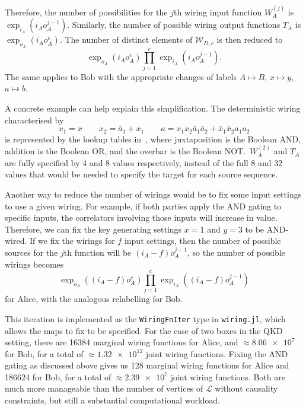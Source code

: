 \documentclass[10pt, a4paper]{article}
\numberwithin{equation}{section} %
\theoremstyle{definition}
\theoremstyle{plain}
\newcommand{\?}{\mathrel{?}} %
\newcommand{\sW}{\mathcal{W}}
\newcommand{\Ls}{\mathcal{L}}
\begin{document}
              Therefore, the number of possibilities for the \(j\)th wiring input function \(W^{(j)}_{A}\) is \(\exp_{i_A}(i_A o_A^{j-1})\). Similarly, the number of possible wiring output functions \(T_{A}\) is \(\exp_{o_A}(i_A o_A^{c})\). The number of distinct elements of \(\sW_{D,c}\) is then reduced to
              \begin{equation}
                \exp_{o_A}(i_A o_A^c) \prod_{j=1}^c \exp_{i_A}(i_A o_A^{j-1}).
              \end{equation}
              The same applies to Bob with the appropriate changes of labels \(A \mapsto B\), \(x \mapsto y\), \(a \mapsto b\). 

              A concrete example can help explain this simplification. The deterministic wiring characterised by
              \begin{equation}
                x_1 = x \qquad x_2 = \bar{a}_1 + x_1 \qquad a = x_1x_2\bar{a}_1\bar{a}_2 + \bar{x}_1\bar{x}_2a_1a_2\label{eqn:wiringeg}
              \end{equation}
              is represented by the lookup tables in~, where juxtaposition is the Boolean AND, addition is the Boolean OR, and the overbar is the Boolean NOT.\ \(W_{A}^{(2)}\) and \(T_{A}\) are fully specified by 4 and 8 values respectively, instead of the full 8 and 32 values that would be needed to specify the target for each source sequence.

              Another way to reduce the number of wirings would be to fix some input settings to use a given wiring. For example, if both parties apply the AND gating to specific inputs, the correlators involving those inputs will increase in value. Therefore, we can fix the key generating settings \(x = 1\) and \(y = 3\) to be AND-wired. If we fix the wirings for \(f\) input settings, then the number of possible sources for the \(j\)th function will be \((i_A - f) o_A^{j-1}\), so the number of possible wirings becomes
              \begin{equation}
                \exp_{o_A}((i_A-f) o_A^c) \prod_{j=1}^c \exp_{i_A}((i_A-f) o_A^{j-1})
              \end{equation}
              for Alice, with the analogous relabelling for Bob.

              This iteration is implemented as the \verb`WiringFnIter` type in \verb`wiring.jl`, which allows the maps to fix to be specified. For the case of two boxes in the QKD setting, there are 16384 marginal wiring functions for Alice, and \(\approx \num{8.06e7}\) for Bob, for a total of \(\approx \num{1.32e12}\) joint wiring functions. Fixing the AND gating as discussed above gives us 128 marginal wiring functions for Alice and 186624 for Bob, for a total of \(\approx \num{2.39e7}\) joint wiring functions. Both are much more manageable than the number of vertices of \(\Ls\) without causality constraints, but still a substantial computational workload.
\end{document}
